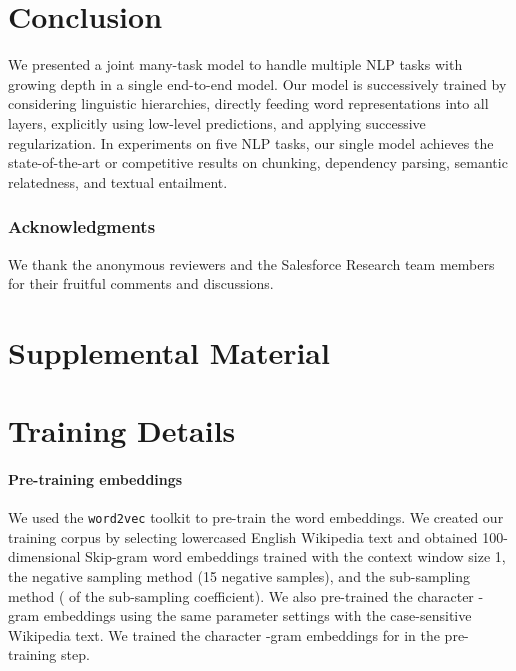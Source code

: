 \documentclass[11pt,a4paper]{article}
\begin{document}
\section{Conclusion}
We presented a joint many-task model to handle multiple NLP tasks with growing depth in a single end-to-end model.
Our model is successively trained by considering linguistic hierarchies, directly feeding word representations into all layers, explicitly using low-level predictions, and applying successive regularization.
In experiments on five NLP tasks, our single model achieves the state-of-the-art or competitive results on chunking, dependency parsing, semantic relatedness, and textual entailment.

\subsubsection*{Acknowledgments}
We thank the anonymous reviewers and the Salesforce Research team members for their fruitful comments and discussions.






\appendix



\section*{Supplemental Material}


\section{Training Details}

\paragraph{Pre-training embeddings}
We used the {\tt word2vec} toolkit to pre-train the word embeddings.
We created our training corpus by selecting lowercased English Wikipedia text and obtained 100-dimensional Skip-gram word embeddings trained with the context window size 1, the negative sampling method (15 negative samples), and the sub-sampling method ( of the sub-sampling coefficient).
We also pre-trained the character -gram embeddings using the same parameter settings with the case-sensitive Wikipedia text.
We trained the character -gram embeddings for  in the pre-training step.
\end{document}
